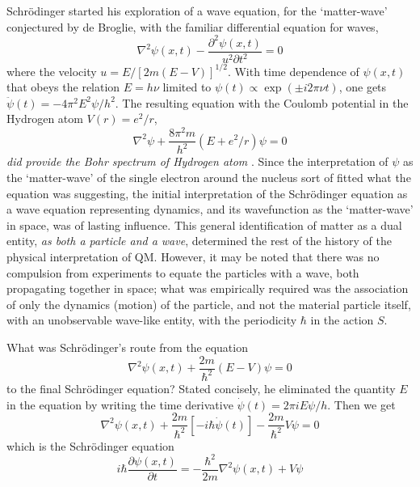 Schr\"{o}dinger started his exploration of a wave equation, for the `matter-wave' conjectured
by de Broglie, with the familiar differential equation for waves,
\begin{equation*}
\nabla^2 \psi (x,t) - \frac{\partial^2 \psi (x,t)}{u^2 \partial t^2} = 0 \tag{2}\label{c14-eq2}
\end{equation*}
where the velocity $u = E/ [2m(E - V )]^{1/2}$. With time dependence of $\psi(x,t)$
that obeys the relation $E = h\nu$ limited to $\psi(t)  \propto  \exp (\pm i2\pi \nu t)$, one gets $\ddot{\psi} (t) = -4 \pi^2 E^2 \psi /h^2$.
The resulting equation with the Coulomb potential in the Hydrogen atom $V (r) = e^2 /r$,
\begin{equation*}
\nabla^2 \psi + \frac{8 \pi^2 m}{h^2} (E + e^2 / r) \psi = 0 \tag{3}\label{c14-eq3}
\end{equation*}
\textit{did provide the Bohr spectrum of Hydrogen atom} \cite{chap14-key1}. Since the interpretation of $\psi$ as the
`matter-wave' of the single electron around the nucleus sort of fitted what the equation was
suggesting, the initial interpretation of the Schr\"{o}dinger equation as a wave equation 
representing dynamics, and its wavefunction as the `matter-wave' in space, was of lasting influence.
This general identification of matter as a dual entity, \textit{as both a particle and a wave}, determined the rest of the history of the physical interpretation of QM. However, it may be noted that there was no compulsion from experiments to equate the particles with a wave,
both propagating together in space; what was empirically required was the association of only the
dynamics (motion) of the particle, and not the material particle itself, with an unobservable
wave-like entity, with the periodicity $\hbar$ in the action $S$.

What was Schr\"{o}dinger's route from the equation
\begin{equation*}
\nabla^2 \psi(x,t) + \frac{2m}{\hbar^2} (E-V) \psi = 0 \tag{4}\label{c14-eq4}
\end{equation*}
to the final Schr\"{o}dinger equation? Stated concisely, he eliminated the quantity $E$ in the
equation by writing the time derivative $\dot{\psi}(t) = 2\pi i E \psi /h$. Then we get
\begin{equation*}
\nabla^2 \psi (x,t)  + \frac{2m}{\hbar^2} [-i \hbar \dot{\psi} (t)] - \frac{2m}{\hbar^2} V\psi = 0 \tag{5}\label{c14-eq5}
\end{equation*}
which is the Schr\"{o}dinger equation
\begin{equation*}
i \hbar \frac{\partial \psi (x,t)}{\partial t} = - \frac{\hbar^2}{2m} \nabla^2 \psi (x,t) + V \psi  \tag{6}\label{c14-eq6}
\end{equation*}

